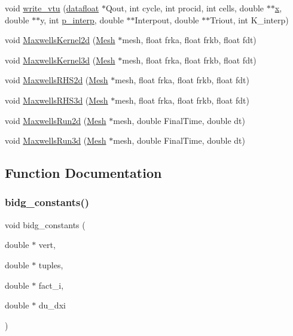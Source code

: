 \begin{DoxyCompactItemize}
\item 
void \hyperlink{a00554_aa275e5ac3935009592aad28f023ed4a1}{write\+\_\+vtu} (\hyperlink{a00557_aa484d27c864c1a224505d8a302c0a4a4}{datafloat} $\ast$Qout, int cycle, int procid, int cells, double $\ast$$\ast$\hyperlink{a00605_ac98c3bb25378222646e977292011625f}{x}, double $\ast$$\ast$y, int \hyperlink{a00563_a08a5429e87fabfe926dd685750b12894}{p\+\_\+interp}, double $\ast$$\ast$Interpout, double $\ast$$\ast$Triout, int K\+\_\+interp)
\item 
void \hyperlink{a00554_a9db283bf2b7ea0ec1c4f6f898ef67f73}{Maxwells\+Kernel2d} (\hyperlink{a00557_aeffbe0891ab73a4d8964c9cb7978426e}{Mesh} $\ast$mesh, float frka, float frkb, float fdt)
\item 
void \hyperlink{a00554_aebe732d2b2c755a4892e1eacb6a2b2a7}{Maxwells\+Kernel3d} (\hyperlink{a00557_aeffbe0891ab73a4d8964c9cb7978426e}{Mesh} $\ast$mesh, float frka, float frkb, float fdt)
\item 
void \hyperlink{a00554_acabe0a53c2062136f9d423f071668a02}{Maxwells\+R\+H\+S2d} (\hyperlink{a00557_aeffbe0891ab73a4d8964c9cb7978426e}{Mesh} $\ast$mesh, float frka, float frkb, float fdt)
\item 
void \hyperlink{a00554_a819aa63bee26ada32119a2a58ddab139}{Maxwells\+R\+H\+S3d} (\hyperlink{a00557_aeffbe0891ab73a4d8964c9cb7978426e}{Mesh} $\ast$mesh, float frka, float frkb, float fdt)
\item 
void \hyperlink{a00554_a08cfe992d80b7b195cfd3a3c366b8f65}{Maxwells\+Run2d} (\hyperlink{a00557_aeffbe0891ab73a4d8964c9cb7978426e}{Mesh} $\ast$mesh, double Final\+Time, double dt)
\item 
void \hyperlink{a00554_a630113a871c79c54d968c6c233e59145}{Maxwells\+Run3d} (\hyperlink{a00557_aeffbe0891ab73a4d8964c9cb7978426e}{Mesh} $\ast$mesh, double Final\+Time, double dt)
\end{DoxyCompactItemize}


\subsection{Function Documentation}
\mbox{\label{a00554_a45390a77c9093b8b1144623da67508c8}} 
\subsubsection{\texorpdfstring{bidg\+\_\+constants()}{bidg\_constants()}}
{\footnotesize\ttfamily void bidg\+\_\+constants (\begin{DoxyParamCaption}\item[{double $\ast$}]{vert,  }\item[{double $\ast$}]{tuples,  }\item[{double $\ast$}]{fact\+\_\+i,  }\item[{double $\ast$}]{du\+\_\+dxi }\end{DoxyParamCaption})}

